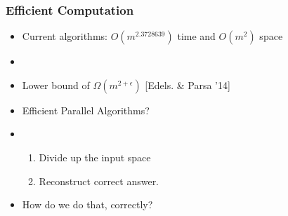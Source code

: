 \begin{frame}
\frametitle{Efficient Computation}
\hspace{1in}
\begin{itemize}
\item<1->[Problem:] Current algorithms: $O(m^{2.3728639})$ time and $O(m^2)$ space
\item<2->[Goal:] 
\item<3->[Issue:] Lower bound of $\Omega(m^{2+\epsilon})$  [Edels. \& Parsa '14]
\item<5->[New Goal:] Efficient Parallel Algorithms?
\item<6->[Approach:] \begin{enumerate}
			\item Divide up the input space
			\item Reconstruct correct answer.
			\end{enumerate}
\item<7->[Question:] How do we do that, correctly?
\end{itemize}
\end{frame}
